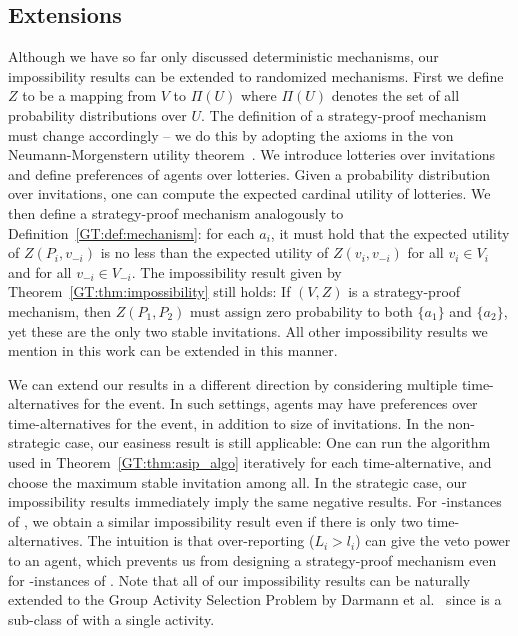 \subsection{Extensions}\label{GT:sec:asip_extension}
Although we have so far only discussed deterministic mechanisms, our impossibility results can be extended to randomized mechanisms. First we define $Z$ to be a mapping from $V$ to $\Pi(U)$ where $\Pi(U)$ denotes the set of all probability distributions over $U$. The definition of a strategy-proof mechanism must change accordingly -- we do this by adopting the axioms in the von Neumann-Morgenstern utility theorem~\cite{von1947theory}. We introduce lotteries over invitations and define preferences of agents over lotteries. Given a probability distribution over invitations, one can compute the expected cardinal utility of lotteries. We then define a strategy-proof mechanism analogously to Definition~\ref{GT:def:mechanism}: for each $a_i$, it must hold that the expected utility of $Z(P_i, v_{-i})$ is no less than the expected utility of $Z(v_i, v_{-i})$ for all $v_i\in V_i$ and for all $v_{-i} \in V_{-i}$. The impossibility result given by Theorem~\ref{GT:thm:impossibility} still holds: If $(V, Z)$ is a strategy-proof mechanism, then $Z(P_1, P_2)$ must assign zero probability to both $\{a_1\}$ and $\{a_2\}$, yet these are the only two stable invitations.  All other impossibility results we mention in this work can be extended in this manner.

We can extend our results in a different direction by considering multiple time-alternatives for the event. In such settings, agents may have preferences over time-alternatives for the event, in addition to size of invitations.   
In the non-strategic case, our easiness result is still applicable: One can run the algorithm used in Theorem~\ref{GT:thm:asip_algo} iteratively for each time-alternative, and choose the maximum stable invitation among all.
In the strategic case, our impossibility results immediately imply the same negative results. 
For \INC-instances of \ASIP, we obtain a similar impossibility result even if there is only two time-alternatives. The intuition is that over-reporting ($L_i > l_i$) can give the veto power to an agent, which prevents us from designing a strategy-proof mechanism even for \INC-instances of \ASIP. Note that all of our impossibility results can be naturally extended to the Group Activity Selection Problem by Darmann et al.~\cite{GASP12WINE} since \ASIPs is a sub-class of \GASPs with a single activity.
